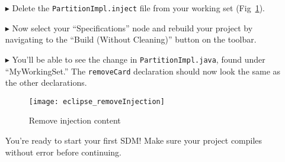 \begin{itemize}

\item[$\blacktriangleright$] Delete the \texttt{PartitionImpl.inject} file from your working set (Fig~\ref{fig:delete_injection}).

\item[$\blacktriangleright$] Now select your ``Specifications'' node and rebuild your project by navigating to the ``Build (Without Cleaning)'' button on the
toolbar.

\item[$\blacktriangleright$] You'll be able to see the change in \texttt{PartitionImpl.java}, found under ``MyWorkingSet.'' The \texttt{removeCard}
declaration should now look the same as the other declarations.

\newpage

\vspace*{3cm}

\begin{figure}[htbp]
	\centering
    \texttt{[image: eclipse\_removeInjection]}
	\caption{Remove injection content}
	\label{fig:delete_injection}
\end{figure}

\vspace{0.5cm}

You're ready to start your first SDM! Make sure your project compiles without error before continuing.


\end{itemize}




